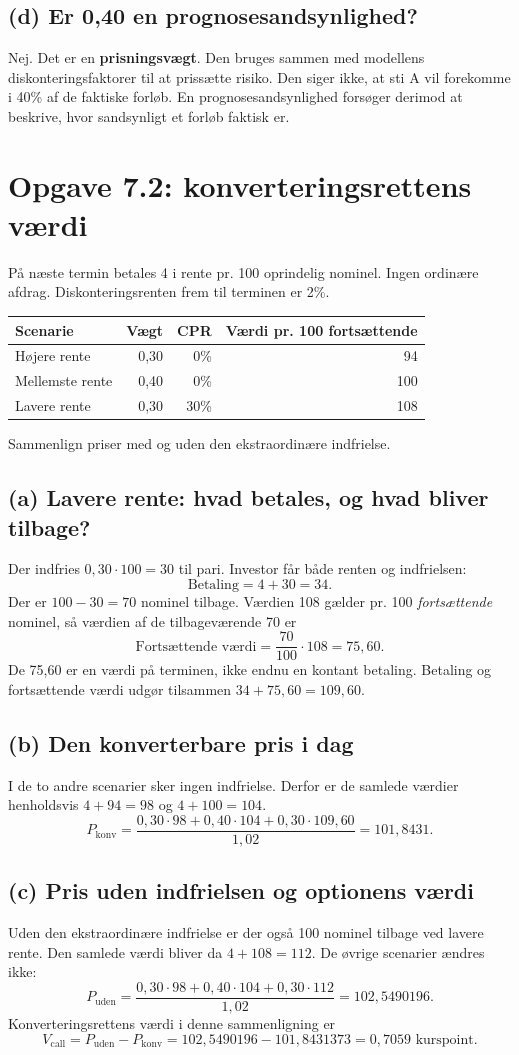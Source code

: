 \documentclass[11pt,a4paper]{article}
\newcommand{\opgave}[1]{\section*{#1}}
\newcommand{\del}[1]{\subsection*{#1}}
\begin{document}
\del{(d) Er 0,40 en prognosesandsynlighed?}
Nej. Det er en \textbf{prisningsvægt}. Den bruges sammen med modellens diskonteringsfaktorer til at prissætte risiko. Den siger ikke, at sti A vil forekomme i 40\% af de faktiske forløb. En prognosesandsynlighed forsøger derimod at beskrive, hvor sandsynligt et forløb faktisk er.

\newpage
\opgave{Opgave 7.2: konverteringsrettens værdi}
\begin{tcolorbox}[title=Opgavebeskrivelse]
På næste termin betales 4 i rente pr. 100 oprindelig nominel. Ingen ordinære afdrag. Diskonteringsrenten frem til terminen er 2\%.
\begin{center}\small\begin{tabular}{lrrr}\toprule
Scenarie & Vægt & CPR & Værdi pr. 100 fortsættende\\\midrule
Højere rente & 0,30 & 0\% & 94\\
Mellemste rente & 0,40 & 0\% & 100\\
Lavere rente & 0,30 & 30\% & 108\\\bottomrule
\end{tabular}\end{center}
Sammenlign priser med og uden den ekstraordinære indfrielse.
\end{tcolorbox}
\del{(a) Lavere rente: hvad betales, og hvad bliver tilbage?}
Der indfries $0{,}30\cdot100=30$ til pari. Investor får både renten og indfrielsen:
\[
\text{Betaling}=4+30=\boxed{34}.
\]
Der er $100-30=70$ nominel tilbage. Værdien 108 gælder pr. 100 \emph{fortsættende} nominel, så værdien af de tilbageværende 70 er
\[
\text{Fortsættende værdi}=\frac{70}{100}\cdot108=\boxed{75{,}60}.
\]
De 75,60 er en værdi på terminen, ikke endnu en kontant betaling. Betaling og fortsættende værdi udgør tilsammen $34+75{,}60=109{,}60$.

\del{(b) Den konverterbare pris i dag}
I de to andre scenarier sker ingen indfrielse. Derfor er de samlede værdier henholdsvis $4+94=98$ og $4+100=104$.
\[
P_{\mathrm{konv}}=\frac{0{,}30\cdot98+0{,}40\cdot104+0{,}30\cdot109{,}60}{1{,}02}
=\boxed{101{,}8431}.
\]

\del{(c) Pris uden indfrielsen og optionens værdi}
Uden den ekstraordinære indfrielse er der også 100 nominel tilbage ved lavere rente. Den samlede værdi bliver da $4+108=112$. De øvrige scenarier ændres ikke:
\[
P_{\mathrm{uden}}=\frac{0{,}30\cdot98+0{,}40\cdot104+0{,}30\cdot112}{1{,}02}
=102{,}5490196.
\]
Konverteringsrettens værdi i denne sammenligning er
\[
V_{\mathrm{call}}=P_{\mathrm{uden}}-P_{\mathrm{konv}}
=102{,}5490196-101{,}8431373=\boxed{0{,}7059\text{ kurspoint}}.
\]
\end{document}
